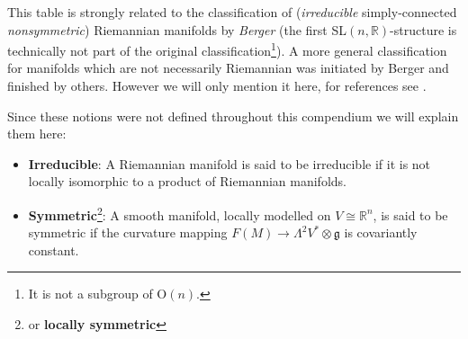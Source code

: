 	\begin{remark*}
		This table is strongly related to the classification of (\textit{irreducible} simply-connected \textit{nonsymmetric}) Riemannian manifolds by \textit{Berger} (the first SL$(n, \mathbb{R})$-structure is technically not part of the original classification\footnote{It is not a subgroup of O$(n)$.}). A more general classification for manifolds which are not necessarily Riemannian was initiated by Berger and finished by others. However we will only mention it here, for references see \cite{diffgeom_physics}.
		
		Since these notions were not defined throughout this compendium we will explain them here:
		\begin{itemize}
			\item \textbf{Irreducible}: A Riemannian manifold is said to be irreducible if it is not locally isomorphic to a product of Riemannian manifolds.
			\item \textbf{Symmetric}\footnote{or \textbf{locally symmetric}}: A smooth manifold, locally modelled on $V\cong\mathbb{R}^n$, is said to be symmetric if the curvature mapping $F(M)\rightarrow\Lambda^2V^*\otimes\mathfrak{g}$ is covariantly constant.
		\end{itemize}
	\end{remark*}
